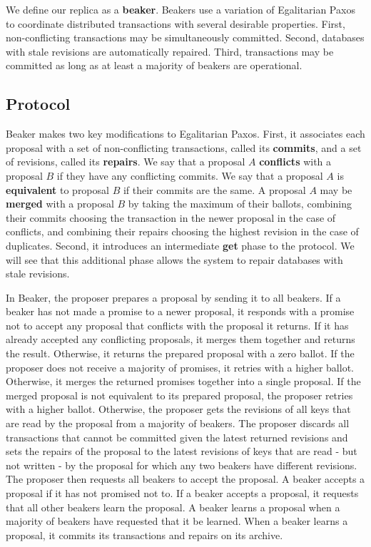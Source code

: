 \documentclass[../main.tex]{subfiles}
\begin{document}
  We define our replica as a \textbf{beaker}. Beakers use a variation of Egalitarian Paxos to
  coordinate distributed transactions with several desirable properties. First, non-conflicting
  transactions may be simultaneously committed. Second, databases with stale revisions are
  automatically repaired. Third, transactions may be committed as long as at least a majority of
  beakers are operational.

  \subsection{Protocol}
  Beaker makes two key modifications to Egalitarian Paxos. First, it associates each proposal with
  a set of non-conflicting transactions, called its \textbf{commits}, and a set of revisions,
  called its \textbf{repairs}. We say that a proposal $A$ \textbf{conflicts} with a proposal $B$ if
  they have any conflicting commits. We say that a proposal $A$ is \textbf{equivalent} to proposal
  $B$ if their commits are the same. A proposal $A$ may be \textbf{merged} with a proposal $B$ by
  taking the maximum of their ballots, combining their commits choosing the transaction in the
  newer proposal in the case of conflicts, and combining their repairs choosing the highest
  revision in the case of duplicates. Second, it introduces an intermediate \textbf{get} phase to
  the protocol. We will see that this additional phase allows the system to repair databases with
  stale revisions.

  In Beaker, the proposer prepares a proposal by sending it to all beakers. If a beaker has not
  made a promise to a newer proposal, it responds with a promise not to accept any proposal that
  conflicts with the proposal it returns. If it has already accepted any conflicting proposals, it
  merges them together and returns the result. Otherwise, it returns the prepared proposal with a
  zero ballot. If the proposer does not receive a majority of promises, it retries with a higher
  ballot. Otherwise, it merges the returned promises together into a single proposal. If the
  merged proposal is not equivalent to its prepared proposal, the proposer retries with a higher
  ballot. Otherwise, the proposer gets the revisions of all keys that are read by the proposal
  from a majority of beakers. The proposer discards all transactions that cannot be committed
  given the latest returned revisions and sets the repairs of the proposal to the latest revisions
  of keys that are read - but not written - by the proposal for which any two beakers have
  different revisions. The proposer then requests all beakers to accept the proposal. A
  beaker accepts a proposal if it has not promised not to. If a beaker accepts a proposal, it
  requests that all other beakers learn the proposal. A beaker learns a proposal when a majority
  of beakers have requested that it be learned. When a beaker learns a proposal, it commits its
  transactions and repairs on its archive.
\end{document}
